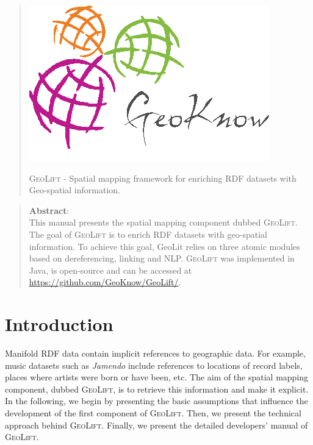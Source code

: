 \documentclass[a4paper,twoside,bibtotoc,abstracton,12pt,BCOR=15mm]{article}
\newcommand{\geolift}{\textsc{GeoLift}\xspace}
\begin{document}


\vspace*{\fill} 
\begin{quote} 
\centering 
\begin{center}
 \includegraphics[scale=0.5]{images/geoknow.png}
\end{center}
\begin{flushleft}
 \Large{\geolift}
 \small{ - Spatial mapping framework for enriching RDF datasets with Geo-spatial information.}
\end{flushleft}
\end{quote}
\vspace*{\fill}
\newpage

\vspace*{\fill} 
\begin{quote} 

\textbf{Abstract}: \\
This manual presents the spatial mapping component dubbed \geolift. 
The goal of \geolift is to enrich RDF datasets with geo-spatial information. 
To achieve this goal, GeoLit relies on three atomic modules based on dereferencing, linking and NLP. 
\geolift was implemented in Java, is open-source and can be accessed at \url{https://github.com/GeoKnow/GeoLift/}. 
\end{quote}
\vspace*{\fill}

\newpage
\tableofcontents
\newpage

\section{Introduction}
Manifold RDF data contain implicit references to geographic data.
For example, music datasets such as \emph{Jamendo} include references to locations of record labels, places where artists were born or have been, etc.
The aim of the spatial mapping component, dubbed \geolift, is to retrieve this information and make it explicit.
In the following, we begin by presenting the basic assumptions that influence the development of the first component of \geolift.
Then, we present the technical approach behind \geolift.
Finally, we present the detailed developers' manual of \geolift.
\end{document}
